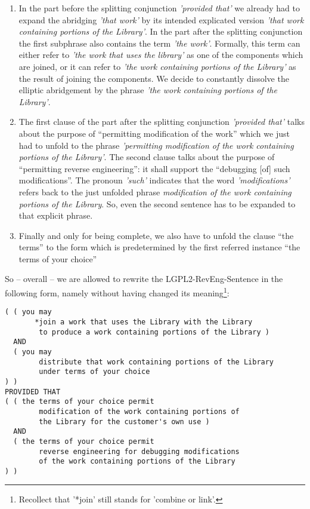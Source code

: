 \begin{enumerate}
  \item  In the part before the splitting conjunction \emph{'provided that'} we
  already had to expand the abridging \emph{'that work'} by its intended
  explicated version \emph{'that work containing portions of the Library'}.  In
  the part after the splitting conjunction the first subphrase also contains the
  term \emph{'the work'}. Formally, this term can either refer to \emph{'the
  work that uses the library'} as one of the components which are joined, or it
  can refer to \emph{'the work containing portions of the Library'} as the
  result of joining the components. We decide to constantly dissolve the
  elliptic abridgement by the phrase \emph{'the work containing portions of the
  Library'}.
  \item The first clause of the part after the splitting conjunction
  \emph{'provided that'} talks about the purpose of \enquote{permitting
  modification of the work} which we just had to unfold to the phrase
  \emph{'permitting modification of the work containing portions of the
  Library'}. The second clause talks about the purpose of \enquote{permitting
  reverse engineering}: it shall support the \enquote{debugging [of] such
  modifications}. The pronoun \emph{'such'} indicates that the word
  \emph{'modifications'} refers back to the just unfolded phrase
  \emph{modification of the work containing portions of the Library}. So, even
  the second sentence has to be expanded to that explicit phrase.
  \item Finally and only for being complete, we also have to unfold the clause
  \enquote{the terms} to the form which is predetermined by the first referred
  instance \enquote{the terms of your choice}
\end{enumerate}

So -- overall -- we are allowed to rewrite the LGPL2-RevEng-Sentence 
in the following form, namely without having changed its
meaning\footnote{Recollect that '*join' still stands for 'combine or link'.}:

\begin{verbatim}
( ( you may 
       *join a work that uses the Library with the Library
        to produce a work containing portions of the Library )
  AND 
  ( you may 
        distribute that work containing portions of the Library
        under terms of your choice 
) )
PROVIDED THAT
( ( the terms of your choice permit 
        modification of the work containing portions of 
        the Library for the customer's own use )
  AND
  ( the terms of your choice permit
        reverse engineering for debugging modifications 
        of the work containing portions of the Library   
) )
\end{verbatim}

